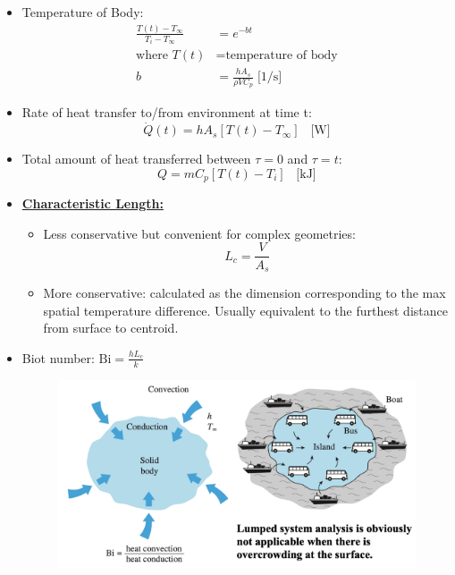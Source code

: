 \begin{itemize}
    \item Temperature of Body:
    \begin{align*}
        \frac{T(t) - T_{\infty}}{T_i - T_{\infty}} &= e^{-bt} \\
        \text{where } T(t) &= \text{temperature of body}\\
        b &= \frac{h A_s}{\rho V C_p} \; \text{[1/s]}
    \end{align*}
    \item Rate of heat transfer to/from environment at time t:
    \begin{equation*}
        \dot{Q}(t) = h A_s [T(t) - T_{\infty}] \;\; \; \text{[W]} 
    \end{equation*}
    \item Total amount of heat transferred between $\tau=0$ and $\tau = t$:
    \begin{equation*}
        Q = m C_p [T(t) - T_i] \;\; \; \text{[kJ]}
    \end{equation*}
    \item \textbf{\underline{Characteristic Length:}} 
    \begin{itemize}
        \item Less conservative but convenient for complex geometries: 
        \begin{equation*}
            L_c = \frac{V}{A_s} 
        \end{equation*}
        \item More conservative: calculated as the dimension corresponding to the max spatial temperature difference. Usually equivalent to \color{red} the furthest distance from surface to centroid. \color{black} 
    \end{itemize}
    \item Biot number: $\text{Bi} = \frac{h L_c}{k}$
    \begin{figure}[H]
        \centering
        \includegraphics[width=1.0\linewidth]{images/Biot_number.png}

\end{figure}
\end{itemize}
